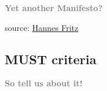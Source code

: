 \documentclass{beamer}
\begin{document}
\begin{frame}
  \vspace*{-1cm}
  \textcolor{gray}{
    \begin{center}
      \textbf{
        \fontsize{60}{50}\selectfont Yet another Manifesto?
      }
    \end{center}
  }

\end{frame}

{
  \begin{frame}
    \vspace*{6.7cm}
    \tiny source: \href{http://www.flickr.com/photos/sensorsicht/5338348801/}{Hannes Fritz}

  \end{frame}
}

\subsection{MUST criteria}

\begin{frame}
  \vspace*{-1cm}
  \textcolor{gray}{
    \begin{center}
      \textbf{
        \fontsize{60}{50}\selectfont So tell us about it!
      }
    \end{center}
  }
\end{frame}
\end{document}
